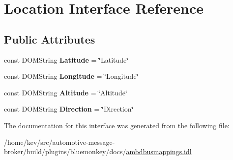 \hypertarget{interfaceLocation}{\section{Location Interface Reference}
\label{interfaceLocation}
}
\subsection*{Public Attributes}
\begin{DoxyCompactItemize}
\item 
\hypertarget{interfaceLocation_ae698fe48315e9e92946ea75721b26139}{const D\+O\+M\+String {\bfseries Latitude} = \char`\"{}Latitude\char`\"{}}\label{interfaceLocation_ae698fe48315e9e92946ea75721b26139}

\item 
\hypertarget{interfaceLocation_a5547f45ead8139cc78d98c09255afc4c}{const D\+O\+M\+String {\bfseries Longitude} = \char`\"{}Longitude\char`\"{}}\label{interfaceLocation_a5547f45ead8139cc78d98c09255afc4c}

\item 
\hypertarget{interfaceLocation_abd771571317087346843e2a644841661}{const D\+O\+M\+String {\bfseries Altitude} = \char`\"{}Altitude\char`\"{}}\label{interfaceLocation_abd771571317087346843e2a644841661}

\item 
\hypertarget{interfaceLocation_af2a71548ea22d2db2027c81ffb131f08}{const D\+O\+M\+String {\bfseries Direction} = \char`\"{}Direction\char`\"{}}\label{interfaceLocation_af2a71548ea22d2db2027c81ffb131f08}

\end{DoxyCompactItemize}


The documentation for this interface was generated from the following file\+:\begin{DoxyCompactItemize}
\item 
/home/kev/src/automotive-\/message-\/broker/build/plugins/bluemonkey/docs/\hyperlink{ambdbusmappings_8idl}{ambdbusmappings.\+idl}\end{DoxyCompactItemize}
